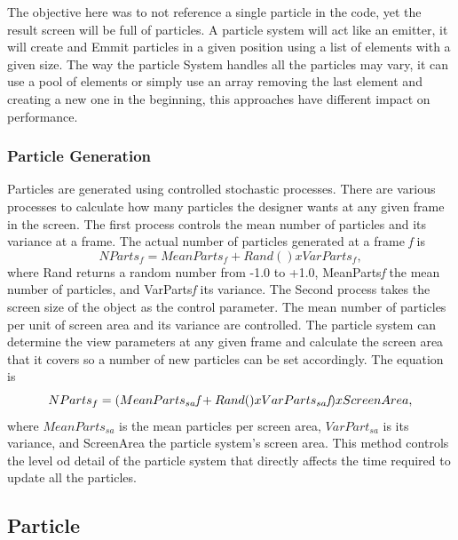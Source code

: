 The objective here was to not reference a single particle in the code, yet the result screen will be full of particles. A particle system will act like an emitter, it will create and Emmit particles in a given position using a list of elements with a given size. The way the particle System handles all the particles may vary, it can use a pool of elements or simply use an array removing the last element and creating a new one in the beginning, this approaches have different impact on performance.

\subsubsection{Particle Generation}
Particles are generated using controlled stochastic processes. There are various processes to calculate how many particles the designer wants at any given frame in the screen. The first process controls the mean number of particles and its variance at a frame. The actual number of particles generated at a frame \emph{f} is 
\begin{equation}
\label{eqn:01}
	NParts_{f} = MeanParts_{f} + Rand() x VarParts_{f},
\end{equation}
where Rand returns a random number from -1.0 to +1.0, MeanParts\emph{f} the mean number of particles, and VarParts\emph{f} its variance.
	The Second process takes the screen size of the object as the control parameter. The mean number of particles per unit of screen area and its variance are controlled. The particle system can determine the view parameters at any given frame and calculate the screen area that it covers so a number of new particles can be set accordingly. The equation is
\begin{equation}
\label{eqn:02}
	NParts_{f} = (MeanParts_{sa}\emph{f} + Rand() x VarParts_{sa}\emph{f}) x ScreenArea,
\end{equation}
where $MeanParts_{sa}$ is the mean particles per screen area, $VarPart_{sa}$ is its variance, and ScreenArea the particle system's screen area. This method controls the level od detail of the particle system that directly affects the time required to update all the particles.

\subsection{Particle}

